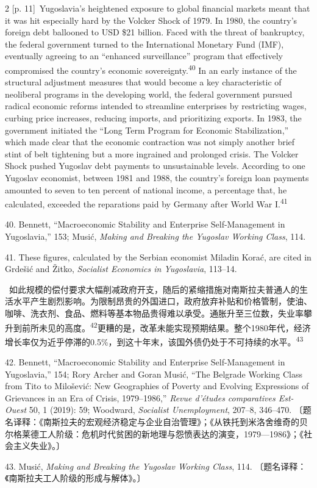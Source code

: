 \documentclass[10pt,a4paper]{article}
\begin{document}
\begin{paracol}{2}
\switchcolumn
{\scriptsize\color{gray} [p. 11]}\ Yugoslavia’s heightened exposure to global financial markets meant that it was hit especially hard by the Volcker Shock of 1979. In 1980, the country’s foreign debt ballooned to USD \$21 billion. Faced with the threat of bankruptcy, the federal government turned to the International Monetary Fund (IMF), eventually agreeing to an “enhanced surveillance” program that effectively compromised the country’s economic sovereignty.\nobreak\textsuperscript{40} In an early instance of the structural adjustment measures that would become a key characteristic of neoliberal programs in the developing world, the federal government pursued radical economic reforms intended to streamline enterprises by restricting wages, curbing price increases, reducing imports, and prioritizing exports. In 1983, the government initiated the “Long Term Program for Economic Stabilization,” which made clear that the economic contraction was not simply another brief stint of belt tightening but a more ingrained and prolonged crisis. The Volcker Shock pushed Yugoslav debt payments to unsustainable levels. According to one Yugoslav economist, between 1981 and 1988, the country’s foreign loan payments amounted to seven to ten percent of national income, a percentage that, he calculated, exceeded the reparations paid by Germany after World War I.\nobreak\textsuperscript{41}\par{\small 40. Bennett, “Macroeconomic Stability and Enterprise Self-Management in Yugoslavia,” 153; Musić, \textit{Making and Breaking the Yugoslav Working Class}, 114.\par}{\small 41. These figures, calculated by the Serbian economist Miladin Korać, are cited in Grdešić and Žitko, \textit{Socialist Economics in Yugoslavia}, 113–14.\par}
\switchcolumn*
{\scriptsize\color{gray} [p. 12]}\ 如此规模的偿付要求大幅削减政府开支，随后的紧缩措施对南斯拉夫普通人的生活水平产生剧烈影响。为限制昂贵的外国进口，政府放弃补贴和价格管制，使油、咖啡、洗衣剂、食品、燃料等基本物品贵得难以承受。通胀升至三位数，失业率攀升到前所未见的高\mbox{度。\textsuperscript{42}}更糟的是，改革未能实现预期结果。整个1980年代，经济增长率仅为近乎停滞的0.5\%，到这十年末，该国外债仍处于不可持续的水\mbox{平。\textsuperscript{43}}\par{\small 42. Bennett, “Macroeconomic Stability and Enterprise Self-Management in Yugoslavia,” 154; Rory Archer and Goran Musić, “The Belgrade Working Class from Tito to Milošević: New Geographies of Poverty and Evolving Expressions of Grievances in an Era of Crisis, 1979–1986,” \textit{Revue d’études comparatives Est-Ouest} 50, 1 (2019): 59; Woodward, \textit{Socialist Unemployment}, 207–8, 346–470. 〔题名译释：《南斯拉夫的宏观经济稳定与企业自治管理》；《从铁托到米洛舍维奇的贝尔格莱德工人阶级：危机时代贫困的新地理与怨愤表达的演变，1979—1986》；《社会主义失业》。〕\par}{\small 43. Musić, \textit{Making and Breaking the Yugoslav Working Class}, 114. 〔题名译释：《南斯拉夫工人阶级的形成与解体》。〕\par}

\end{paracol}
\end{document}
